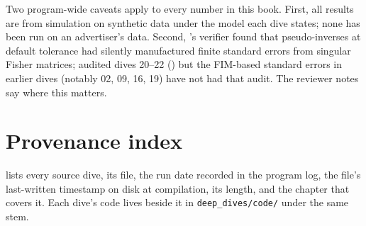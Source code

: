 Two program-wide caveats apply to every number in this book. First, all results are from simulation on
synthetic data under the model each dive states; none has been run on an advertiser's data. Second,
's verifier found that pseudo-inverses at default tolerance had silently manufactured finite standard
errors from singular Fisher matrices;  audited dives 20--22 () but the FIM-based standard
errors in earlier dives (notably 02, 09, 16, 19) have not had that audit. The reviewer notes say where this
matters.

\section*{Provenance index}

 lists every source dive, its file, the run date recorded in the program log, the
file's last-written timestamp on disk at compilation, its length, and the chapter that covers it. Each dive's
code lives beside it in \texttt{deep\_dives/code/} under the same stem.

